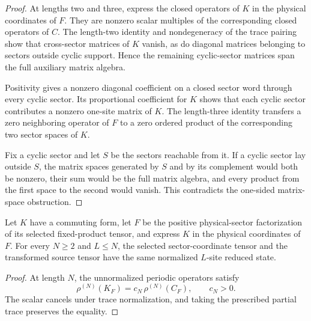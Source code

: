 \begin{proof}\leanok
    At lengths two and three, express the closed operators of $K$ in the
    physical coordinates of $F$. They are nonzero scalar multiples of the
    corresponding closed operators of $C$. The length-two identity and
    nondegeneracy of the trace pairing show that cross-sector matrices of
    $K$ vanish, as do diagonal matrices belonging to sectors outside cyclic
    support. Hence the remaining cyclic-sector matrices span the full
    auxiliary matrix algebra.

    Positivity gives a nonzero diagonal coefficient on a closed sector
    word through every cyclic sector. Its proportional coefficient for $K$
    shows that each cyclic sector contributes a nonzero one-site matrix of
    $K$. The length-three identity transfers a zero neighboring operator of
    $F$ to a zero ordered product of the corresponding two sector spaces of
    $K$.

    Fix a cyclic sector and let $S$ be the sectors reachable from it. If a
    cyclic sector lay outside $S$, the matrix spaces generated by $S$ and by
    its complement would both be nonzero, their sum would be the full matrix
    algebra, and every product from the first space to the second would
    vanish. This contradicts the one-sided matrix-space obstruction.
\end{proof}

\begin{lemma}
    \label{thm:mpdo_selected_fixed_product_reduced_states}
    \leanok
    Let $K$ have a commuting form, let $F$ be the positive
    physical-sector factorization of its selected fixed-product tensor, and
    express $K$ in the physical coordinates of $F$. For every $N\geq2$ and
    $L\leq N$, the selected sector-coordinate tensor and the transformed
    source tensor have the same normalized $L$-site reduced state.
\end{lemma}

\begin{proof}\leanok
    At length $N$, the unnormalized periodic operators satisfy
    \[
        \rho^{(N)}(K_F)=c_N\,\rho^{(N)}(C_F),
        \qquad c_N>0.
    \]
    The scalar cancels under trace normalization, and taking the prescribed
    partial trace preserves the equality.
\end{proof}

